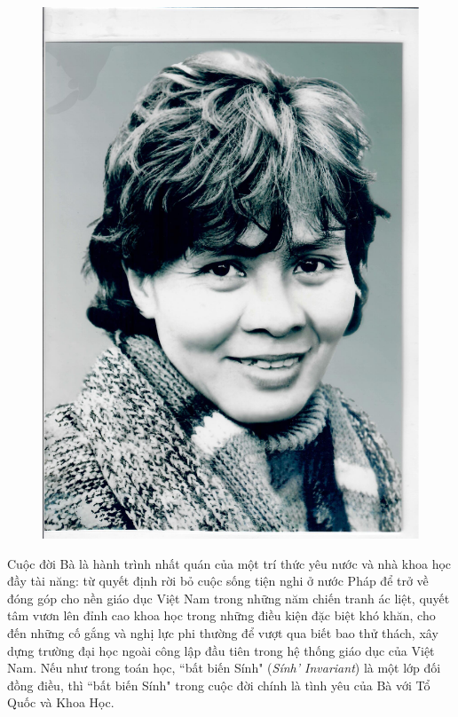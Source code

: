 \begin{multicols}{2}
\begin{figure}[H]
		\includegraphics[width= 1\linewidth]{Anh12}
		\caption{\small\textit{\color{doisongtoanhoc}}}
		\vspace*{-20pt}
	\end{figure} 
	Cuộc đời Bà là hành trình nhất quán của một trí thức yêu nước và nhà khoa học đầy tài năng: từ quyết định rời bỏ cuộc sống tiện nghi ở nước Pháp để trở về đóng góp cho nền giáo dục Việt Nam trong những năm chiến tranh ác liệt, quyết tâm vươn lên đỉnh cao khoa học trong những điều kiện đặc biệt khó khăn, cho đến những cố gắng và nghị lực phi thường để vượt qua biết bao thử thách, xây dựng trường đại học ngoài công lập đầu tiên trong hệ thống giáo dục của Việt Nam.
	\vskip 0.1cm
	Nếu như trong toán học, ``bất biến Sính" (\textit{Sính' Invariant}) là một lớp đối đồng điều, thì ``bất biến Sính" trong cuộc đời chính là tình yêu của Bà với Tổ Quốc và Khoa Học. 
\end{multicols}